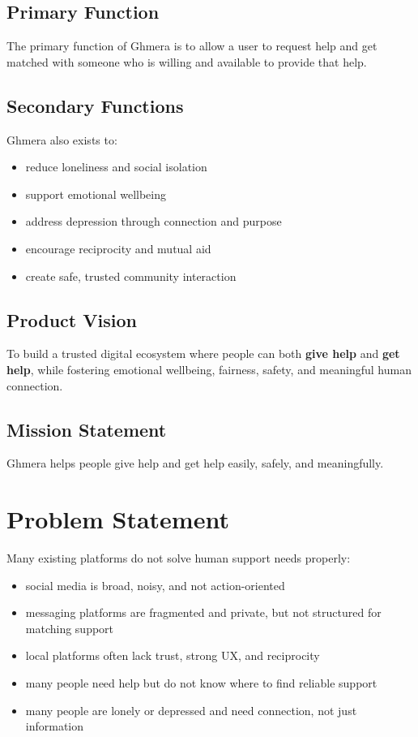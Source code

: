 \documentclass[11pt]{article}
\begin{document}
\subsection{Primary Function}
The primary function of Ghmera is to allow a user to request help and get matched with someone who is willing and available to provide that help.

\subsection{Secondary Functions}
Ghmera also exists to:
\begin{itemize}[leftmargin=1.5em]
    \item reduce loneliness and social isolation
    \item support emotional wellbeing
    \item address depression through connection and purpose
    \item encourage reciprocity and mutual aid
    \item create safe, trusted community interaction
\end{itemize}

\subsection{Product Vision}
To build a trusted digital ecosystem where people can both \textbf{give help} and \textbf{get help}, while fostering emotional wellbeing, fairness, safety, and meaningful human connection.

\subsection{Mission Statement}
Ghmera helps people give help and get help easily, safely, and meaningfully.

\section{Problem Statement}

Many existing platforms do not solve human support needs properly:
\begin{itemize}[leftmargin=1.5em]
    \item social media is broad, noisy, and not action-oriented
    \item messaging platforms are fragmented and private, but not structured for matching support
    \item local platforms often lack trust, strong UX, and reciprocity
    \item many people need help but do not know where to find reliable support
    \item many people are lonely or depressed and need connection, not just information
\end{itemize}
\end{document}

